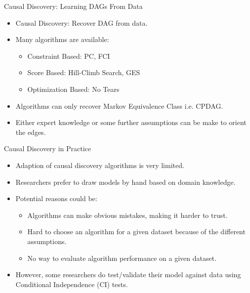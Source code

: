 \documentclass{beamer}
\begin{document}
\begin{frame}{Causal Discovery: Learning DAGs From Data}
	\begin{itemize}
		\item Causal Discovery: Recover DAG from data.
		\item Many algorithms are available:
			\begin{itemize}
				\item Constraint Based: PC, FCI
				\item Score Based: Hill-Climb Search, GES
				\item Optimization Based: No Tears
			\end{itemize}
		\item Algorithms can only recover Markov Equivalence Class i.e. CPDAG.
		\item Either expert knowledge or some further assumptions can
			be make to orient the edges.
	\end{itemize}
\end{frame}

\begin{frame}{Causal Discovery in Practice}
	\begin{itemize}
		\item Adaption of causal discovery algorithms is very limited.
		\item Researchers prefer to draw models by hand based on domain knowledge.
		\item Potential reasons could be:
			\begin{itemize}
				\item Algorithms can make obvious mistakes, making it harder to trust.
				\item Hard to choose an algorithm for a given dataset because of the different assumptions.
				\item No way to evaluate algorithm performance on a given dataset.
			\end{itemize}
		\item However, some researchers do test/validate their model against data using Conditional Independence (CI) tests.
	\end{itemize}
\end{frame}
\end{document}
